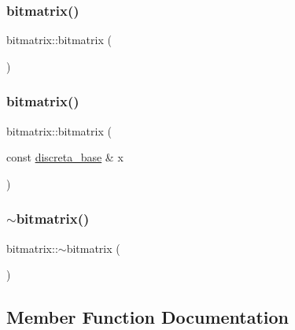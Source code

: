 \subsubsection{\texorpdfstring{bitmatrix()}{bitmatrix()}\hspace{0.1cm}{\footnotesize\ttfamily [1/2]}}
{\footnotesize\ttfamily bitmatrix\+::bitmatrix (\begin{DoxyParamCaption}{ }\end{DoxyParamCaption})}

\mbox{\label{classbitmatrix_a6a2ab85aca9b9c4a40336aceee91b24a}} 
\subsubsection{\texorpdfstring{bitmatrix()}{bitmatrix()}\hspace{0.1cm}{\footnotesize\ttfamily [2/2]}}
{\footnotesize\ttfamily bitmatrix\+::bitmatrix (\begin{DoxyParamCaption}\item[{const \mbox{\hyperlink{classdiscreta__base}{discreta\+\_\+base}} \&}]{x }\end{DoxyParamCaption})}

\mbox{\label{classbitmatrix_a0ecd1bb827e476fb99640190cfa973f6}} 
\subsubsection{\texorpdfstring{$\sim$bitmatrix()}{~bitmatrix()}}
{\footnotesize\ttfamily bitmatrix\+::$\sim$bitmatrix (\begin{DoxyParamCaption}{ }\end{DoxyParamCaption})}



\subsection{Member Function Documentation}
\mbox{\label{classbitmatrix_afb73fc8dc14653159b63b969c5ca4856}} 
